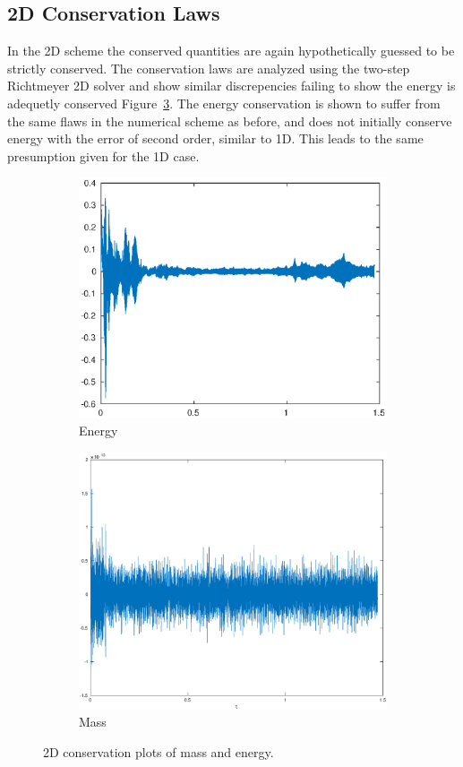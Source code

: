 \subsection{2D Conservation Laws}

In the 2D scheme the conserved quantities are again hypothetically guessed to be strictly conserved. The conservation laws
are analyzed using the two-step Richtmeyer 2D solver and show similar discrepencies
failing to show the energy is adequetly conserved Figure~\ref{fig:2Dcons_A}. 
The energy conservation is shown to suffer from the same flaws in the numerical scheme as before, and does not initially conserve
energy with the error of second order, similar to 1D. This leads to the same
presumption given for the 1D case. 
\newline

\begin{figure}[h!]
    \centering
    \begin{subfigure}[b]{0.9\textwidth}
        \centering
        \includegraphics[width=1.1\textwidth,height=0.52\textwidth]{images/cons_energy.eps}\hfill
        \caption{Energy}
        \label{fig:Energy}
    \end{subfigure}
    \hfill
    \begin{subfigure}[b]{0.9\textwidth}
        \centering
        \includegraphics[width=1.1\textwidth, height=0.52\textwidth]{images/cons_mass.eps}\hfill
        \caption{Mass}
        \label{fig:Mass}
    \end{subfigure}
    \hfill
    \caption{2D conservation plots of mass and energy.}
    \label{fig:2Dcons_A}
\end{figure}


